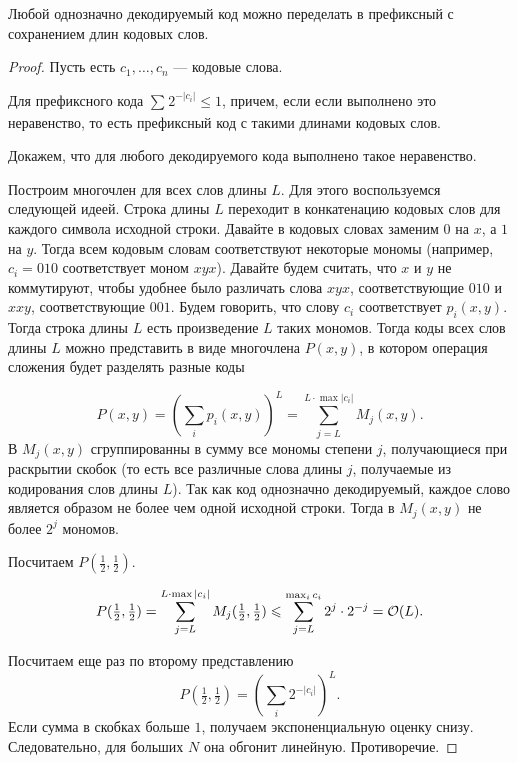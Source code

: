 \begin{thm}
    Любой однозначно декодируемый код можно переделать в префиксный с сохранением длин кодовых слов.
\end{thm}
\begin{proof}
	Пусть есть $  c_1, \ldots , c_n$ --- кодовые слова.

	Для префиксного кода $ \sum_{}^{} 2^{-\lvert c_i \rvert } \le 1$, причем, если если выполнено это неравенство, то есть префиксный код с такими длинами кодовых слов.

	Докажем, что для любого декодируемого кода выполнено такое неравенство.

	Построим многочлен для всех слов длины $ L$. 
	Для этого воспользуемся следующей идеей.
	Строка длины $L$ переходит в конкатенацию кодовых слов для каждого символа исходной строки. Давайте в кодовых словах заменим $0$ на $x$, а $1$ на $y$. Тогда всем кодовым словам соответствуют некоторые мономы (например, $c_i = 010$ соответствует моном $xyx$). Давайте будем считать, что $x$ и $y$ не коммутируют, чтобы удобнее было различать слова $xyx$, соответствующие $010$ и $xxy$, соответствующие $001$. Будем говорить, что слову $c_i$ соответствует $p_i(x,y)$. Тогда строка длины $L$ есть произведение $L$ таких мономов. Тогда коды всех слов длины $L$ можно представить в виде многочлена $P(x, y)$, в котором операция сложения будет разделять разные коды 

	\[
		P(x, y) = \left( \sum_{i}^{} p_i(x, y) \right) ^{L} = \sum_{j=L}^{L\cdot\max|c_i|} M_j(x, y)
	.\] 
	В $M_j(x, y)$ сгруппированны в сумму все мономы степени $j$, получающиеся при раскрытии скобок (то есть все различные слова длины $j$, получаемые из кодирования слов длины $L$). Так как код однозначно декодируемый, каждое слово является образом не более чем одной исходной строки. Тогда в $M_j(x, y)$ не более $2^j$ мономов.

	Посчитаем $ P(\frac{1}{2}, \frac{1}{2})$.

	\[
		P(\tfrac{1}{2},\tfrac{1}{2}) = \sum_{j=L}^{L\cdot\max|c_i|} M_{j}(\tfrac{1}{2},\tfrac{1}{2}) \leqslant \sum_{j=L}^{\max_{i} c_i}2^{j} \cdot 2 ^{-j} = \mathcal{O}(L)
	.\] 

	Посчитаем еще раз по второму представлению
	\[
		P(\tfrac{1}{2},\tfrac{1}{2}) = \left( \sum_{i}^{} 2^{-\lvert c_i \rvert } \right) ^{L}
	.\] 
	Если сумма в скобках больше $ 1$, получаем экспоненциальную оценку снизу.
	Следовательно, для больших $ N$ она обгонит линейную. Противоречие.
	

\end{proof}
